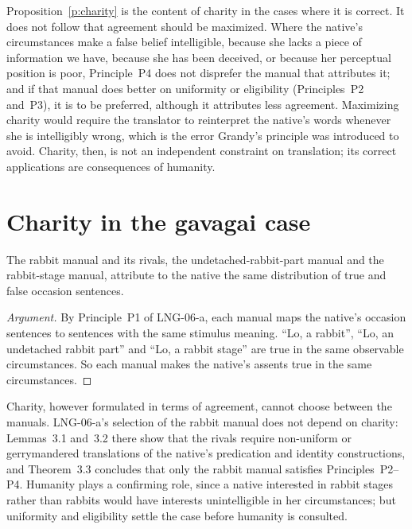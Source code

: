 \documentclass{situationist-preprint}
\begin{document}
Proposition~\ref{p:charity} is the content of charity in the cases where it is correct. It does not follow that agreement should be maximized. Where the native's circumstances make a false belief intelligible, because she lacks a piece of information we have, because she has been deceived, or because her perceptual position is poor, Principle~P4 does not disprefer the manual that attributes it; and if that manual does better on uniformity or eligibility (Principles~P2 and~P3), it is to be preferred, although it attributes less agreement. Maximizing charity would require the translator to reinterpret the native's words whenever she is intelligibly wrong, which is the error Grandy's principle was introduced to avoid. Charity, then, is not an independent constraint on translation; its correct applications are consequences of humanity.

\section{Charity in the gavagai case}

\begin{proposition}\label{p:idle}
The rabbit manual and its rivals, the undetached-rabbit-part manual and the rabbit-stage manual, attribute to the native the same distribution of true and false occasion sentences.
\end{proposition}

\begin{proof}[Argument]
By Principle~P1 of LNG-06-a, each manual maps the native's occasion sentences to sentences with the same stimulus meaning. \enquote{Lo, a rabbit}, \enquote{Lo, an undetached rabbit part} and \enquote{Lo, a rabbit stage} are true in the same observable circumstances. So each manual makes the native's assents true in the same circumstances.
\end{proof}

Charity, however formulated in terms of agreement, cannot choose between the manuals. LNG-06-a's selection of the rabbit manual does not depend on charity: Lemmas~3.1 and~3.2 there show that the rivals require non-uniform or gerrymandered translations of the native's predication and identity constructions, and Theorem~3.3 concludes that only the rabbit manual satisfies Principles~P2--P4. Humanity plays a confirming role, since a native interested in rabbit stages rather than rabbits would have interests unintelligible in her circumstances; but uniformity and eligibility settle the case before humanity is consulted.
\end{document}

